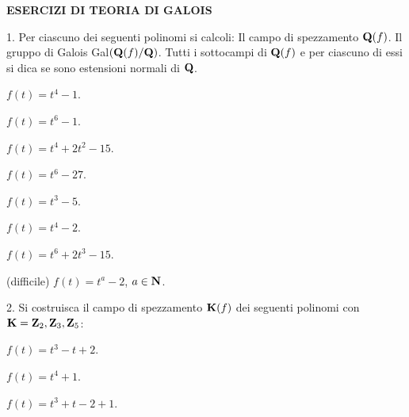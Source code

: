 \nopagenumbers
{}

\centerline{\bf ESERCIZI DI TEORIA DI GALOIS}
\bigskip
\bigskip\bigskip\bigskip

\item{1.} Per ciascuno dei seguenti polinomi si calcoli:
 Il campo di spezzamento ${\bf Q}(f)$.
 Il gruppo di Galois Gal$({\bf Q}(f)/{\bf Q})$.
 Tutti i sottocampi di ${\bf Q}(f)$ e per
ciascuno di essi si dica se sono estensioni normali di ${\bf Q}$.

 $f(t)=t^4-1$.\bigskip

 $f(t)=t^6-1$.\bigskip

 $f(t)=t^4+2t^2-15$.\bigskip

 $f(t)=t^6-27$.\bigskip

 $f(t)=t^3-5$.\bigskip

 $f(t)=t^4-2$.\bigskip

 $f(t)=t^6+2t^3-15$.\bigskip

 (difficile) $f(t)=t^a-2$, $a\in{\bf N}$.\bigskip\bigskip

\item{2.} Si costruisca il campo di spezzamento ${\bf K}(f)$ dei
seguenti polinomi con ${\bf K}={\bf Z}_2,{\bf Z}_3,{\bf Z}_5$:
\bigskip

 $f(t)=t^3-t+2$.\bigskip

 $f(t)=t^4+1$.\bigskip

 $f(t)=t^3+t-2+1$.
\bye
